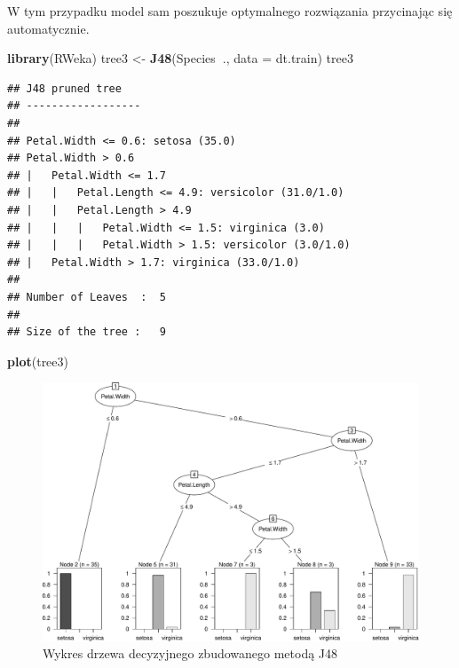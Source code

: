 \documentclass[
]{book}
\newenvironment{Shaded}{\begin{snugshade}}{\end{snugshade}}
\newcommand{\DataTypeTok}[1]{\textcolor[rgb]{0.13,0.29,0.53}{#1}}
\newcommand{\KeywordTok}[1]{\textcolor[rgb]{0.13,0.29,0.53}{\textbf{#1}}}
\newcommand{\NormalTok}[1]{#1}
\newcommand{\OperatorTok}[1]{\textcolor[rgb]{0.81,0.36,0.00}{\textbf{#1}}}
\newcommand{\StringTok}[1]{\textcolor[rgb]{0.31,0.60,0.02}{#1}}
\theoremstyle{plain}
\theoremstyle{definition}
\theoremstyle{definition}
\theoremstyle{definition}
\theoremstyle{definition}
\theoremstyle{remark}
\begin{document}
W tym przypadku model sam poszukuje optymalnego rozwiązania przycinając się automatycznie.

\begin{Shaded}
\begin{Highlighting}[]
\KeywordTok{library}\NormalTok{(RWeka)}
\NormalTok{tree3 <-}\StringTok{ }\KeywordTok{J48}\NormalTok{(Species}\OperatorTok{~}\NormalTok{., }\DataTypeTok{data =}\NormalTok{ dt.train)}
\NormalTok{tree3}
\end{Highlighting}
\end{Shaded}

\begin{verbatim}
## J48 pruned tree
## ------------------
## 
## Petal.Width <= 0.6: setosa (35.0)
## Petal.Width > 0.6
## |   Petal.Width <= 1.7
## |   |   Petal.Length <= 4.9: versicolor (31.0/1.0)
## |   |   Petal.Length > 4.9
## |   |   |   Petal.Width <= 1.5: virginica (3.0)
## |   |   |   Petal.Width > 1.5: versicolor (3.0/1.0)
## |   Petal.Width > 1.7: virginica (33.0/1.0)
## 
## Number of Leaves  :  5
## 
## Size of the tree :   9
\end{verbatim}

\begin{Shaded}
\begin{Highlighting}[]
\KeywordTok{plot}\NormalTok{(tree3)}
\end{Highlighting}
\end{Shaded}

\begin{figure}
\centering
\includegraphics{EksploracjaDanych_files/figure-latex/J48-1.pdf}
\caption{\label{fig:J48}Wykres drzewa decyzyjnego zbudowanego metodą J48}
\end{figure}
\end{document}
